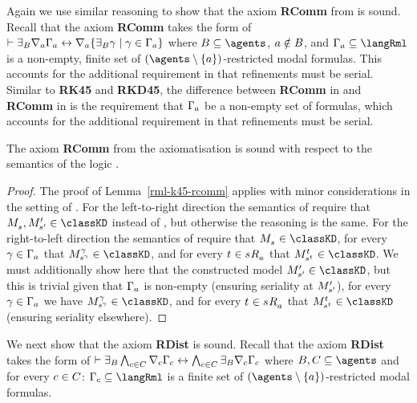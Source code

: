 Again we use similar reasoning to show that the axiom {\bf RComm} from \axiomRmlK{} is sound.
Recall that the axiom {\bf RComm} takes the form of $\vdash {\exists_{B}} \nabla_{a} \Gamma_a \leftrightarrow \nabla_{a} \{{\exists_{B}} \gamma \mid \gamma \in \Gamma_a\}$ where $\agentsB \subseteq \agents$, $a \notin B$, and $\Gamma_\agentA \subseteq \langRml$ is a non-empty, finite set of $(\agents \setminus \{\agentA\})$-restricted modal formulas.
This accounts for the additional requirement in \logicRmlKD{} that refinements must be serial.
Similar to {\bf RK45} and {\bf RKD45}, the difference between {\bf RComm} in \axiomRmlKFF{} and {\bf RComm} in \axiomRmlKD{} is the requirement that $\Gamma_a$ be a non-empty set of formulas, which accounts for the additional requirement in \logicRmlKD{} that refinements must be serial.

\begin{lemma}\label{rml-kd45-rcomm}
The axiom {\bf RComm} from the axiomatisation \axiomRmlKD{} is sound with respect to the semantics of the logic \logicRmlKD{}.
\end{lemma}

\begin{proof}
The proof of Lemma~\ref{rml-k45-rcomm} applies with minor considerations in the setting of \logicRmlKD{}.
For the left-to-right direction the semantics of \logicRmlKD{} require that $\kPModel{\kStateS}, \kPModelP{\kStateSP} \in \classKD$ instead of \classKFF{}, but otherwise the reasoning is the same.
For the right-to-left direction the semantics of \logicRmlKD{} require that $\kPModel{\kStateS} \in \classKD$, for every $\gamma \in \Gamma_a$ that $\kPModel[\gamma]{\kStateS[\gamma]} \in \classKD$, and for every $\kStateT \in \kSuccessorsA{\kStateS}$ that $\kPModel[\kStateT]{\kStateS[\kStateT]} \in \classKD$.
We must additionally show here that the constructed model $\kPModelP{\kStateSP} \in \classKD$, but this is trivial given that $\Gamma_a$ is non-empty (ensuring seriality at ${M^{\prime}_{{s}^{\prime}}}$), for every $\gamma \in \Gamma_a$ we have $\kPModel[\gamma]{\kStateS[\gamma]} \in \classKD$, and for every $\kStateT \in \kSuccessorsA{\kStateS}$ that $\kPModel[\kStateT]{\kStateS[\kStateT]} \in \classKD$ (ensuring seriality elsewhere).
\end{proof}

We next show that the axiom {\bf RDist} is sound.
Recall that the axiom {\bf RDist} takes the form of $\vdash {\exists_{B}} \bigwedge_{c \in C} \nabla_{c} \Gamma_c \leftrightarrow \bigwedge_{c \in C} {\exists_{B}} \nabla_{c} \Gamma_c$ where $\agentsB, \agentsC \subseteq \agents$ and for every $c \in C$: $\Gamma_\agentC \subseteq \langRml$ is a finite set of $(\agents \setminus \{\agentA\})$-restricted modal formulas.

